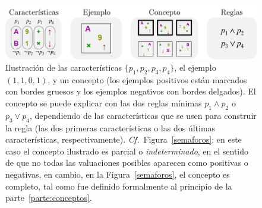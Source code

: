 \begin{figure}[h!]
\begin{center}
	\includegraphics[scale=.6]{../figuras/brm/intro_notation_sp.pdf}
\end{center}\caption{Ilustración de las características $\{p_1,p_2,p_3,p_4\}$, el ejemplo $(1,1,0,1)$, y un concepto (los ejemplos positivos están marcados con bordes gruesos y los ejemplos negativos con bordes delgados). El concepto se puede explicar con las dos reglas mínimas $p_1 \land p_2$ o $ p_3 \lor p_4$, dependiendo de las características que se usen para construir la regla (las dos primeras características o las dos últimas características, respectivamente). {\em Cf.}~Figura~\ref{semaforos}: en este caso el concepto ilustrado es parcial o {\em indeterminado}, en el sentido de que no todas las valuaciones posibles aparecen como positivas o negativas, en cambio, en la Figura~\ref{semaforos}, el concepto es completo, tal como fue definido formalmente al principio de la parte~\ref{parte:conceptos}.}
\label{fig:intro_notation}
\end{figure}


